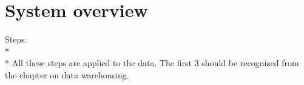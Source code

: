 \chapter{System overview}
Steps:\\*
\\*
All these steps are applied to the data. The first 3 should be recognized from the chapter on data warehousing. 



